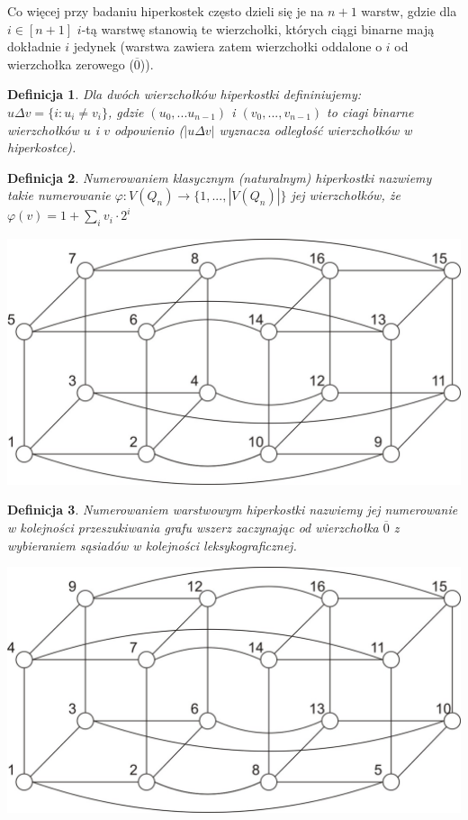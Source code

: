 \documentclass{pracamgr}
\newtheorem{defi}{Definicja}[section] %
\begin{document}
    Co więcej przy badaniu hiperkostek często dzieli się je na $n+1$ warstw, gdzie dla $i\in[n+1]$ $i$-tą warstwę stanowią te wierzchołki,
    których ciągi binarne mają dokładnie $i$ jedynek (warstwa zawiera zatem wierzchołki oddalone o $i$ od wierzchołka zerowego ($\overline{0}$)).
    \begin{defi}\label{delta wierzcholkow}
     Dla dwóch wierzchołków hiperkostki defininiujemy:
     $u\Delta v=\{i:u_i\neq v_i\}$, gdzie $(u_0,...u_{n-1})$ i $(v_0,...,v_{n-1})$ to ciagi binarne wierzchołków $u$ i $v$ odpowienio
     ($|u\Delta v|$ wyznacza odległość wierzchołków w hiperkostce).
    \end{defi}
    \begin{defi}\label{numerowanie klasyczne}
     \emph{Numerowaniem klasycznym (naturalnym)} hiperkostki nazwiemy takie numerowanie $\varphi:V(Q_n)\rightarrow\{1,...,|V(Q_n)|\}$ jej wierzchołków, że
     $\varphi(v)=1+\sum_{i}v_i\cdot2^i$
    \end{defi}
    \begin{center}
     \includegraphics[scale=0.6]{img/Q_4_klasyczne.jpg}
    \end{center}
    \begin{defi}\label{numerowanie warstwowe}%
     \emph{Numerowaniem warstwowym} hiperkostki nazwiemy jej numerowanie w kolejności przeszukiwania grafu wszerz zaczynając od wierzchołka $\overline{0}$
     z wybieraniem sąsiadów w kolejności leksykograficznej.
    \end{defi}
    \begin{center}
    \includegraphics[scale=0.6]{img/Q_4_warstwowe.jpg}
   \end{center}   
\end{document}
